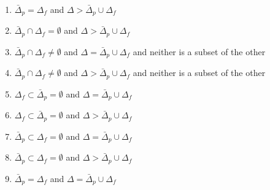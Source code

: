 \documentclass{article}
\author{Jochen Wuttke}
\title{}	%
\begin{document}
\begin{enumerate}
\item $\bar\Delta_p = \Delta_f $ and $\Delta > \bar\Delta_p \cup \Delta_f$

\item $\bar\Delta_p \cap \Delta_f = \emptyset $ and $\Delta > \bar\Delta_p \cup \Delta_f$

\item $\bar\Delta_p \cap \Delta_f \neq \emptyset $ and $\Delta = \bar\Delta_p
\cup \Delta_f$ and neither is a subset of the other

\item $\bar\Delta_p \cap \Delta_f \neq \emptyset $ and $\Delta > \bar\Delta_p
\cup \Delta_f$ and neither is a subset of the other

\item $\Delta_f \subset \bar\Delta_p = \emptyset $ and $\Delta = \bar\Delta_p \cup \Delta_f$

\item $\Delta_f \subset \bar\Delta_p = \emptyset $ and $\Delta > \bar\Delta_p \cup \Delta_f$

\item $\bar\Delta_p \subset \Delta_f = \emptyset $ and $\Delta = \bar\Delta_p \cup \Delta_f$

\item $\bar\Delta_p \subset \Delta_f = \emptyset $ and $\Delta > \bar\Delta_p \cup \Delta_f$

\item $\bar\Delta_p = \Delta_f $ and $\Delta = \bar\Delta_p \cup \Delta_f$

\end{enumerate}
\end{document}
